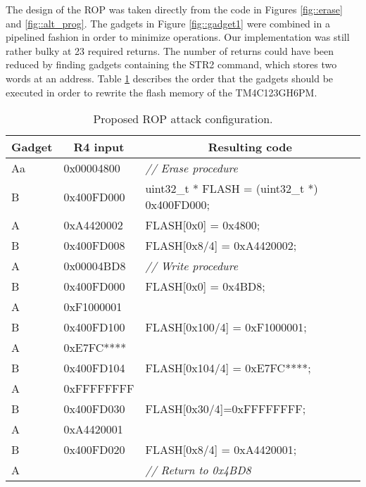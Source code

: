 The design of the ROP was taken directly from the code in Figures \ref{fig::erase} and \ref{fig::alt_prog}. The gadgets in Figure \ref{fig::gadget1} were combined in a pipelined fashion in order to minimize operations. Our implementation was still rather bulky at 23 required returns. The number of returns could have been reduced by finding gadgets containing the STR2 command, which stores two words at an address. Table \ref{tab:gadgets} describes the order that the gadgets should be executed in order to rewrite the flash memory of the TM4C123GH6PM.

\begin{table}[htbp]
  \centering
  \caption{Proposed ROP attack configuration. }
    \begin{tabular}{rrr}
    \toprule
    \multicolumn{1}{c}{Gadget} & \multicolumn{1}{c}{R4 input} & \multicolumn{1}{c}{Resulting code} \\
    \midrule
    \multicolumn{1}{l}{Aa} & \multicolumn{1}{l}{0x00004800} & \multicolumn{1}{l}{\textit{// Erase procedure}} \\
    \multicolumn{1}{l}{B} & \multicolumn{1}{l}{0x400FD000} & \multicolumn{1}{l}{uint32\_t * FLASH = (uint32\_t *) 0x400FD000;} \\
    \multicolumn{1}{l}{A} & \multicolumn{1}{l}{0xA4420002} & \multicolumn{1}{l}{FLASH[0x0] = 0x4800;} \\
    \multicolumn{1}{l}{B} & \multicolumn{1}{l}{0x400FD008} & \multicolumn{1}{l}{FLASH[0x8/4] = 0xA4420002;} \\
    \multicolumn{1}{l}{A} & \multicolumn{1}{l}{0x00004BD8} & \multicolumn{1}{l}{\textit{// Write procedure}} \\
    \multicolumn{1}{l}{B} & \multicolumn{1}{l}{0x400FD000} & \multicolumn{1}{l}{FLASH[0x0] = 0x4BD8;} \\
    \multicolumn{1}{l}{A} & \multicolumn{1}{l}{0xF1000001} &  \\
    \multicolumn{1}{l}{B} & \multicolumn{1}{l}{0x400FD100} & \multicolumn{1}{l}{FLASH[0x100/4] = 0xF1000001;} \\
    \multicolumn{1}{l}{A} & \multicolumn{1}{l}{0xE7FC****} &  \\
    \multicolumn{1}{l}{B} & \multicolumn{1}{l}{0x400FD104} & \multicolumn{1}{l}{FLASH[0x104/4] = 0xE7FC****;} \\
    \multicolumn{1}{l}{A} & \multicolumn{1}{l}{0xFFFFFFFF} & \multicolumn{1}{l}{} \\
    \multicolumn{1}{l}{B} & \multicolumn{1}{l}{0x400FD030} & \multicolumn{1}{l}{FLASH[0x30/4]=0xFFFFFFFF;} \\
    \multicolumn{1}{l}{A} & \multicolumn{1}{l}{0xA4420001} &  \\
    \multicolumn{1}{l}{B} & \multicolumn{1}{l}{0x400FD020} & \multicolumn{1}{l}{FLASH[0x8/4] = 0xA4420001;} \\
    \multicolumn{1}{l}{A} &            & \multicolumn{1}{l}{\textit{// Return to 0x4BD8}} \\
    \bottomrule
    \end{tabular}%
  \label{tab:gadgets}%
\end{table}%
